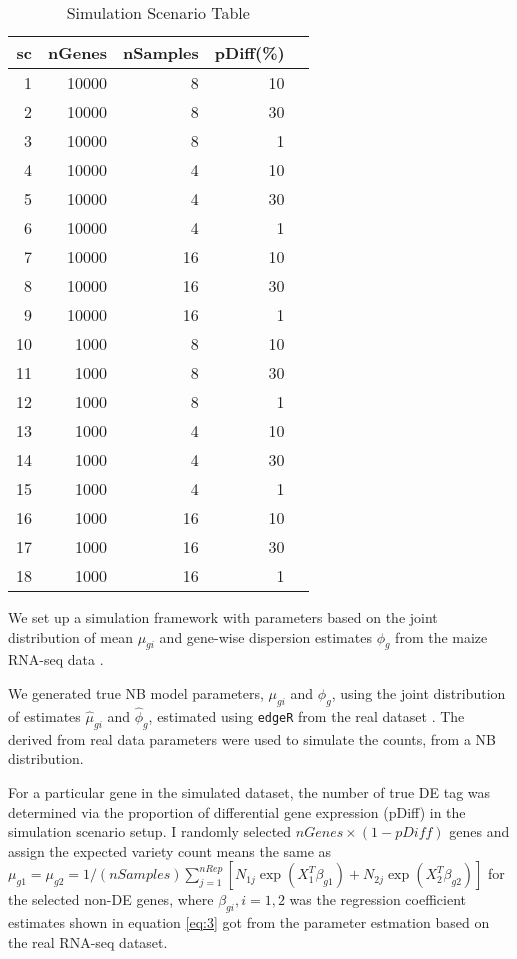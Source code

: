 \begin{table}[H]
\centering
\begin{tabular}{|r|r|r|r|r|}
\hline
sc & nGenes & nSamples & pDiff(\%) \\ 
\hline
1 & 10000 & 8 & 10 \\ 
\hline
2 & 10000 & 8 & 30 \\ 
\hline
3 & 10000 & 8 & 1 \\
\hline
4 & 10000 & 4 & 10 \\
\hline
5 & 10000 & 4 & 30 \\
\hline
6 & 10000 & 4 & 1 \\ 
\hline
7 & 10000 & 16 & 10 \\
\hline
8 & 10000 & 16 & 30 \\ 
\hline
9 & 10000 & 16 & 1 \\
\hline
10& 1000 & 8 & 10 \\
\hline
11 & 1000 & 8 & 30 \\
\hline
12 & 1000 & 8 & 1 \\ 
\hline
13 & 1000 & 4 & 10 \\
\hline
14 & 1000 & 4 & 30 \\
\hline
15 & 1000 & 4 & 1 \\ 
\hline
16 & 1000 & 16 & 10 \\
\hline
17 & 1000 & 16 & 30 \\ 
\hline
18 & 1000 & 16 & 1 \\ 
\hline
\end{tabular}
\caption{Simulation Scenario Table}
\label{tab:Scenario}
\end{table}


We set up a simulation framework with parameters based on the joint distribution of mean $\mu_{gi}$ and gene-wise dispersion estimates $\phi_g$ from the maize RNA-seq data \citep{paschold2012complementation}.

We generated true NB model parameters, $\mu_{gi}$ and $\phi_g$, using the joint distribution of estimates $\hat{\mu}_{gi}$ and $\hat{\phi}_g$, estimated using {\tt edgeR} from the real dataset \citep{paschold2012complementation}. The derived from real data parameters were used to simulate the counts, from a NB distribution. 


For a particular gene in the simulated dataset, the number of true DE tag was determined via the proportion of differential gene expression (pDiff) in the simulation scenario setup. I randomly selected $nGenes \times (1-pDiff)$ genes and assign the expected variety count means the same as $\mu_{g1} = \mu_{g2} = 1/(nSamples)\sum_{j=1}^{nRep} \left[ N_{1j}\exp(X_1^T \beta_{g1})+ N_{2j}\exp(X_2^T \beta_{g2}) \right]$ for the selected non-DE genes, where $\beta_{gi}, i=1,2$ was the regression coefficient estimates shown in equation \eqref{eq:3} got from the parameter estmation based on the real RNA-seq dataset.

